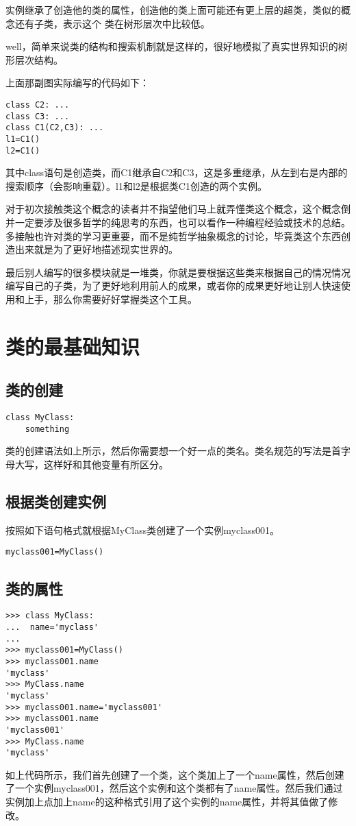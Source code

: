 \documentclass[12pt,oneside]{book}
\begin{document}
\begin{common-format}
实例继承了创造他的类的属性，创造他的类上面可能还有更上层的超类，类似的概念还有子类，表示这个 类在树形层次中比较低。

well，简单来说类的结构和搜索机制就是这样的，很好地模拟了真实世界知识的树形层次结构。

上面那副图实际编写的代码如下：
\begin{Verbatim}
class C2: ...
class C3: ...
class C1(C2,C3): ...
l1=C1()
l2=C1()
\end{Verbatim}
其中class语句是创造类，而C1继承自C2和C3，这是多重继承，从左到右是内部的搜索顺序（会影响重载）。l1和l2是根据类C1创造的两个实例。

对于初次接触类这个概念的读者并不指望他们马上就弄懂类这个概念，这个概念倒并一定要涉及很多哲学的纯思考的东西，也可以看作一种编程经验或技术的总结。多接触也许对类的学习更重要，而不是纯哲学抽象概念的讨论，毕竟类这个东西创造出来就是为了更好地描述现实世界的。

最后别人编写的很多模块就是一堆类，你就是要根据这些类来根据自己的情况情况编写自己的子类，为了更好地利用前人的成果，或者你的成果更好地让别人快速使用和上手，那么你需要好好掌握类这个工具。

\section{类的最基础知识}
\subsection{类的创建}
\begin{Verbatim}
class MyClass:
    something
\end{Verbatim}
类的创建语法如上所示，然后你需要想一个好一点的类名。类名规范的写法是首字母大写，这样好和其他变量有所区分。

\subsection{根据类创建实例}
按照如下语句格式就根据MyClass类创建了一个实例myclass001。
\begin{Verbatim}
myclass001=MyClass()
\end{Verbatim}

\subsection{类的属性}
\begin{Verbatim}
>>> class MyClass:
...  name='myclass'
... 
>>> myclass001=MyClass()
>>> myclass001.name
'myclass'
>>> MyClass.name
'myclass'
>>> myclass001.name='myclass001'
>>> myclass001.name
'myclass001'
>>> MyClass.name
'myclass'
\end{Verbatim}
如上代码所示，我们首先创建了一个类，这个类加上了一个name属性，然后创建了一个实例myclass001，然后这个实例和这个类都有了name属性。然后我们通过实例加上点加上name的这种格式引用了这个实例的name属性，并将其值做了修改。


\end{common-format}
\end{document}
